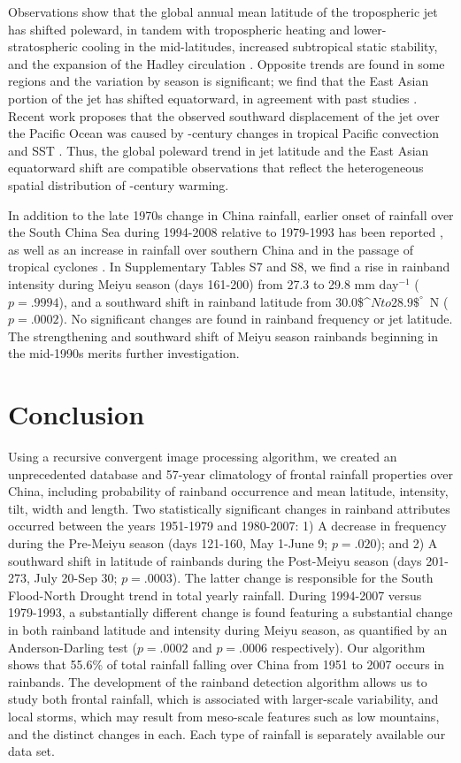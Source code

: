 	 Observations show that the global annual mean latitude of the tropospheric jet has shifted poleward, in tandem with tropospheric heating and lower-stratospheric cooling in the mid-latitudes, increased subtropical static stability, and the expansion of the Hadley circulation \citep{Fu2006,Archer2008,Fu2011}. Opposite trends are found in some regions and the variation by season is significant; we find that the East Asian portion of the jet has shifted equatorward, in agreement with past studies \citep{Yu2007, Archer2008}. Recent work proposes that the observed southward displacement of the jet over the Pacific Ocean was caused by -century changes in tropical Pacific convection and SST \citep{Park2014a}. Thus, the global poleward trend in jet latitude and the East Asian equatorward shift are compatible observations that reflect the heterogeneous spatial distribution of -century warming.
	 
	 In addition to the late 1970s change in China rainfall, earlier onset of rainfall over the South China Sea during 1994-2008 relative to 1979-1993 has been reported \citep{Kajikawa2012}, as well as an increase in rainfall over southern China and in the passage of tropical cyclones \citep{Kwon2007,Chang2014}. In Supplementary Tables S7 and S8, we find a rise in rainband intensity during Meiyu season (days 161-200) from 27.3 to 29.8 mm day$^{-1}$ ($p=.9994$), and a southward shift in rainband latitude from 30.0\$^{\circ}$ N to 28.9\$^{\circ}$\ N ($p=.0002$). No significant changes are found in rainband frequency or jet latitude. The strengthening and southward shift of Meiyu season rainbands beginning in the mid-1990s merits further investigation.
	 				
\section{Conclusion}

	Using a recursive convergent image processing algorithm, we created an unprecedented database and 57-year climatology of frontal rainfall properties over China, including probability of rainband occurrence and mean latitude, intensity, tilt, width and length. Two statistically significant changes in rainband attributes occurred between the years 1951-1979 and 1980-2007: 1) A decrease in frequency during the Pre-Meiyu season (days 121-160, May 1-June 9; $p=.020$); and 2) A southward shift in latitude of rainbands during the Post-Meiyu season (days 201-273, July 20-Sep 30; $p=.0003$). The latter change is responsible for the South Flood-North Drought trend in total yearly rainfall. During 1994-2007 versus 1979-1993, a substantially different change is found featuring a substantial change in both rainband latitude and intensity during Meiyu season, as quantified by an Anderson-Darling test ($p=.0002$ and $p=.0006$ respectively). Our algorithm shows that 55.6\% of total rainfall falling over China from 1951 to 2007 occurs in rainbands. The development of the rainband detection algorithm allows us to study both frontal rainfall, which is associated with larger-scale variability, and local storms, which may result from meso-scale features such as low mountains, and the distinct changes in each. Each type of rainfall is separately available our data set.
	 
